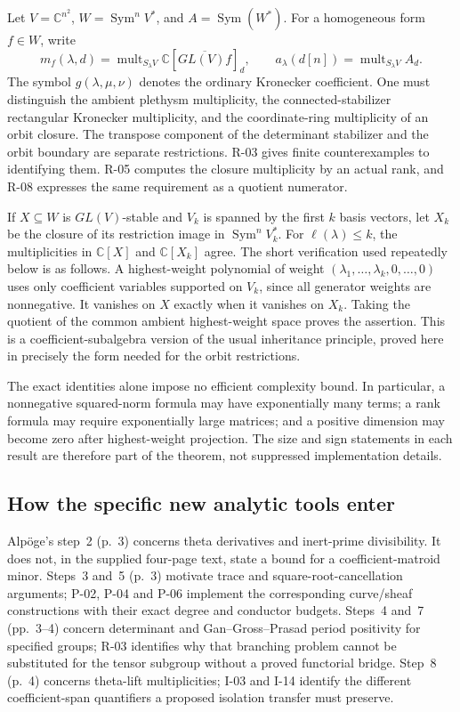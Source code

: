 Let $V=\mathbb C^{n^2}$, $W=\operatorname{Sym}^nV^*$, and $A=\operatorname{Sym}(W^*)$. For a homogeneous form $f\in W$, write
\[
 m_f(\lambda,d)=\operatorname{mult}_{S_\lambda V}\mathbb C[\overline{GL(V)f}]_d,
 \qquad a_\lambda(d[n])=\operatorname{mult}_{S_\lambda V}A_d.
\]
The symbol $g(\lambda,\mu,\nu)$ denotes the ordinary Kronecker coefficient. One must distinguish the ambient plethysm multiplicity, the connected-stabilizer rectangular Kronecker multiplicity, and the coordinate-ring multiplicity of an orbit closure. The transpose component of the determinant stabilizer and the orbit boundary are separate restrictions. R-03 gives finite counterexamples to identifying them. R-05 computes the closure multiplicity by an actual rank, and R-08 expresses the same requirement as a quotient numerator.

If $X\subseteq W$ is $GL(V)$-stable and $V_k$ is spanned by the first $k$ basis vectors, let $X_k$ be the closure of its restriction image in $\operatorname{Sym}^nV_k^*$. For $\ell(\lambda)\leq k$, the multiplicities in $\mathbb C[X]$ and $\mathbb C[X_k]$ agree. The short verification used repeatedly below is as follows. A highest-weight polynomial of weight $(\lambda_1,\ldots,\lambda_k,0,\ldots,0)$ uses only coefficient variables supported on $V_k$, since all generator weights are nonnegative. It vanishes on $X$ exactly when it vanishes on $X_k$. Taking the quotient of the common ambient highest-weight space proves the assertion. This is a coefficient-subalgebra version of the usual inheritance principle, proved here in precisely the form needed for the orbit restrictions.

The exact identities alone impose no efficient complexity bound. In particular, a nonnegative squared-norm formula may have exponentially many terms; a rank formula may require exponentially large matrices; and a positive dimension may become zero after highest-weight projection. The size and sign statements in each result are therefore part of the theorem, not suppressed implementation details.

\subsection{How the specific new analytic tools enter}

Alp\"oge's step~2 (p.~3) concerns theta derivatives and inert-prime divisibility. It does not, in the supplied four-page text, state a bound for a coefficient-matroid minor. Steps~3 and~5 (p.~3) motivate trace and square-root-cancellation arguments; P-02, P-04 and P-06 implement the corresponding curve/sheaf constructions with their exact degree and conductor budgets. Steps~4 and~7 (pp.~3--4) concern determinant and Gan--Gross--Prasad period positivity for specified groups; R-03 identifies why that branching problem cannot be substituted for the tensor subgroup without a proved functorial bridge. Step~8 (p.~4) concerns theta-lift multiplicities; I-03 and I-14 identify the different coefficient-span quantifiers a proposed isolation transfer must preserve.

